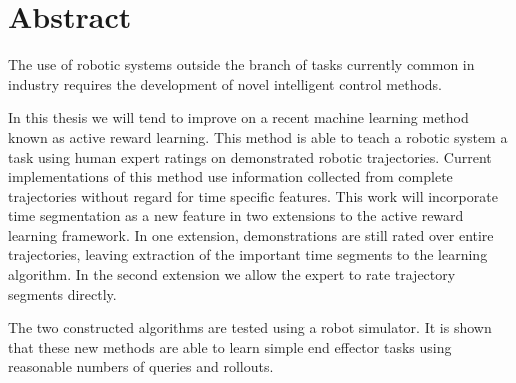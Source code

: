\documentclass[mscThesis.tex]{subfiles}
\begin{document}
%
\chapter*{Abstract}


The use of robotic systems outside the branch of tasks currently common in industry requires the development of novel intelligent control methods. 

In this thesis we will tend to improve on a recent machine learning method known as active reward learning. This method is able to teach a robotic system a task using human expert ratings on demonstrated robotic trajectories. Current implementations of this method use information collected from complete trajectories without regard for time specific features. This work will incorporate time segmentation as a new feature in two extensions to the active reward learning framework. In one extension, demonstrations are still rated over entire trajectories, leaving extraction of the important time segments to the learning algorithm. In the second extension we allow the expert to rate trajectory segments directly.

The two constructed algorithms are tested using a robot simulator. It is shown that these new methods are able to learn simple end effector tasks using reasonable numbers of queries and rollouts. 







%
%
\end{document}
